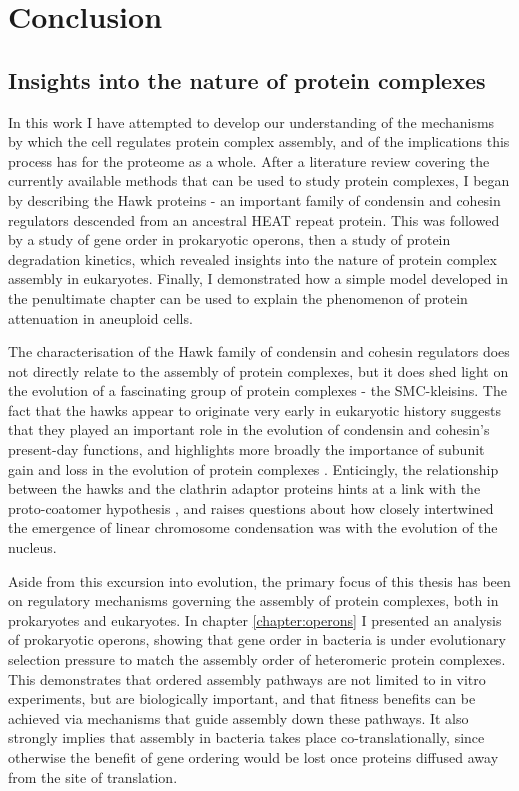 \documentclass[a4paper,11pt,twoside,openright]{scrbook}
\begin{document}
\chapter{Conclusion}\label{chapter:conclusion}
\section{Insights into the nature of protein complexes}
In this work I have attempted to develop our understanding of the mechanisms by which the cell regulates protein complex assembly, and of the implications this process has for the proteome as a whole. After a literature review covering the currently available methods that can be used to study protein complexes, I began by describing the Hawk proteins - an important family of condensin and cohesin regulators descended from an ancestral HEAT repeat protein. This was followed by a study of gene order in prokaryotic operons, then a study of protein degradation kinetics, which revealed insights into the nature of protein complex assembly in eukaryotes. Finally, I demonstrated how a simple model developed in the penultimate chapter can be used to explain the phenomenon of protein attenuation in aneuploid cells.

The characterisation of the Hawk family of condensin and cohesin regulators does not directly relate to the assembly of protein complexes, but it does shed light on the evolution of a fascinating group of protein complexes - the SMC-kleisins. The fact that the hawks appear to originate very early in eukaryotic history suggests that they played an important role in the evolution of condensin and cohesin's present-day functions, and highlights more broadly the importance of subunit gain and loss in the evolution of protein complexes \cite{Seidl2009,Wan2015}. Enticingly, the relationship between the hawks and the clathrin adaptor proteins hints at a link with the proto-coatomer hypothesis \cite{Devos2006,Field2011}, and raises questions about how closely intertwined the emergence of linear chromosome condensation was with the evolution of the nucleus.

Aside from this excursion into evolution, the primary focus of this thesis has been on regulatory mechanisms governing the assembly of protein complexes, both in prokaryotes and eukaryotes. In chapter \ref{chapter:operons} I presented an analysis of prokaryotic operons, showing that gene order in bacteria is under evolutionary selection pressure to match the assembly order of heteromeric protein complexes. This demonstrates that ordered assembly pathways are not limited to in vitro experiments, but are biologically important, and that fitness benefits can be achieved via mechanisms that guide assembly down these pathways. It also strongly implies that assembly in bacteria takes place co-translationally, since otherwise the benefit of gene ordering would be lost once proteins diffused away from the site of translation.
\end{document}
